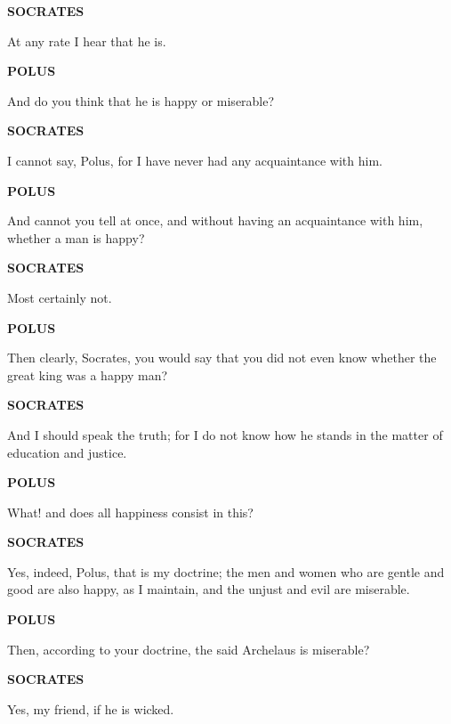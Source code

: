 \documentclass[11pt,letter]{article}
\begin{document}
\par \textbf{SOCRATES}
\par   At any rate I hear that he is.

\par \textbf{POLUS}
\par   And do you think that he is happy or miserable?

\par \textbf{SOCRATES}
\par   I cannot say, Polus, for I have never had any acquaintance with him.

\par \textbf{POLUS}
\par   And cannot you tell at once, and without having an acquaintance with him, whether a man is happy?

\par \textbf{SOCRATES}
\par   Most certainly not.

\par \textbf{POLUS}
\par   Then clearly, Socrates, you would say that you did not even know whether the great king was a happy man?

\par \textbf{SOCRATES}
\par   And I should speak the truth; for I do not know how he stands in the matter of education and justice.

\par \textbf{POLUS}
\par   What! and does all happiness consist in this?

\par \textbf{SOCRATES}
\par   Yes, indeed, Polus, that is my doctrine; the men and women who are gentle and good are also happy, as I maintain, and the unjust and evil are miserable.

\par \textbf{POLUS}
\par   Then, according to your doctrine, the said Archelaus is miserable?

\par \textbf{SOCRATES}
\par   Yes, my friend, if he is wicked.
\end{document}
